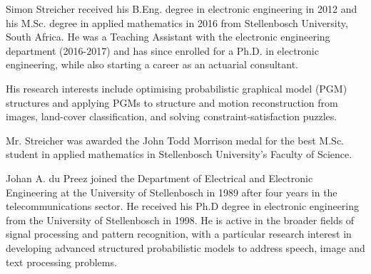 \documentclass{ieeeaccess}
\begin{document}
{\begin{filecontents*}[overwrite]{do-not-edit.bib}
		@inproceedings{mulamba2020hybrid,
			title={{H}ybrid {C}lassification and {R}easoning for {I}mage-based {C}onstraint {S}olving},
			author={Mulamba, Maxime and Mandi, Jayanta and Canoy, Rocsildes and Guns, Tias},
			booktitle={International Conference on Integration of Constraint Programming, Artificial Intelligence, and Operations Research},
			pages={364--380},
			year={2020},
			organization={Springer}
		}
	
		@Article{clue2018,
			author={Neller, Todd W.
				and Luo, Ziqian},
			title={{M}ixed {L}ogical and {P}robabilistic {R}easoning in the {G}ame of {C}lue},
			journal={ICGA Journal},
			year={2018},
			publisher={IOS Press},
			volume={40},
			pages={406-416},
			note={4},
			issn={2468-2438},
			doi={10.3233/ICG-180063},
			url={https://doi.org/10.3233/ICG-180063}
		}
	
		@article{zhao2020superpixels,
			title={{S}uperpixels {E}xtracted via {R}egion {F}usion with {B}oundary {C}onstraint},
			author={Zhao, Li and Li, Zhihui and Men, Chaoguang and Liu, Yongmei},
			journal={Journal of Visual Communication and Image Representation},
			volume={66},
			pages={102743},
			year={2020},
			publisher={Elsevier}
		}
}

	\end{filecontents*}
	
	
	


\begin{IEEEbiography}{Simon Streicher} 
	received his B.Eng. degree in electronic engineering in 2012 and his M.Sc. degree in applied mathematics in 2016 from Stellenbosch University, South Africa. He was a Teaching Assistant with the electronic engineering department (2016-2017) and has since enrolled for a Ph.D. in electronic engineering, while also starting a career as an actuarial consultant.
	
	His research interests include optimising probabilistic graphical model (PGM) structures and applying PGMs to structure and motion reconstruction from images, land-cover classification, and solving constraint-satisfaction puzzles.
	
	Mr. Streicher was awarded the John Todd Morrison medal for the best M.Sc. student in applied mathematics in Stellenbosch University's Faculty of Science. 
\end{IEEEbiography}



\begin{IEEEbiography}{Johan A. du Preez} 
	joined the Department of Electrical and Electronic Engineering at the University of Stellenbosch in 1989 after four years in the telecommunications sector. He received his Ph.D degree in electronic engineering from the University of Stellenbosch in 1998. He is active in the broader fields of signal processing and pattern recognition, with a particular research interest in developing advanced structured probabilistic models to address speech, image and text processing problems.



\end{IEEEbiography}}
\end{document}
